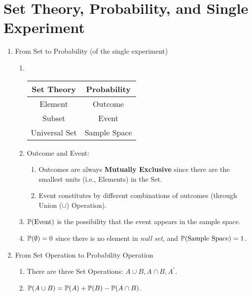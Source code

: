 \chapter{Set Theory, Probability, and Single Experiment}
\begin{enumerate}
    \item From Set to Probability (of the single experiment)
    \begin{enumerate}
        \item~{
            \begin{center}
                \begin{tabular}{|c|c|}
                    \hline
                    \textbf{Set Theory} & \textbf{Probability} \\
                    \hline
                    \hline
                    Element & Outcome \\
                    \hline
                    Subset  & Event   \\
                    \hline
                    Universal Set & Sample Space \\
                    \hline
                \end{tabular}
            \end{center}
                        }
            \item Outcome and Event: {
                \begin{enumerate}
                    \item Outcomes are always \textbf{Mutually Exclusive} since there are the smallest units (i.e., Elements) in the Set.
                    \item Event constitutes by different combinations of outcomes (through Union ($\cup$) Operation).
                \end{enumerate}
            }
            \item $\P{\text{Event}}$ is the possibility that the event appears in the sample space.
            \item $\P{\emptyset}=0$ since there is no element in \textit{null set}, and $\P{\text{Sample Space}}=1$.
    \end{enumerate}
    \item From Set Operation to Probability Operation
    \begin{enumerate}
        \item There are three Set Operations: $A \cup B, A \cap B, A^{^\mathsf{c}}$.
        \item $\P{A \cup B} = \P{A}+\P{B}-\P{A\cap B}$.

\end{enumerate}
\end{enumerate}
